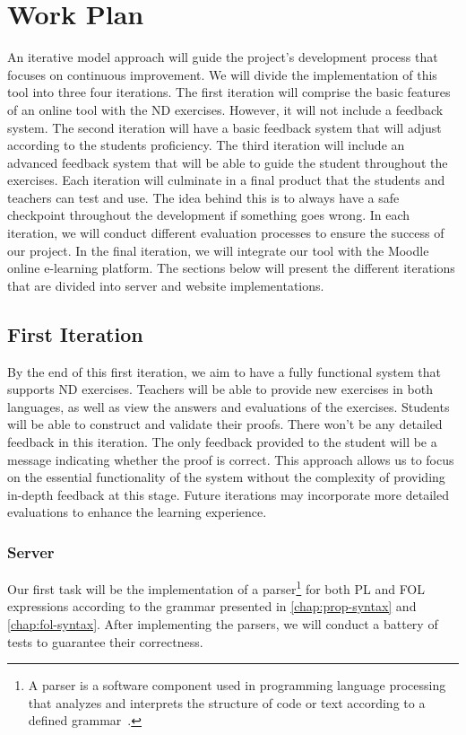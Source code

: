 \section{Work Plan}
An iterative model approach will guide the project's development process that focuses on continuous improvement. We will divide the implementation of this tool into three four iterations. The first iteration will comprise the basic features of an online tool with the \gls{ND} exercises. However, it will not include a feedback system. The second iteration will have a basic feedback system that will adjust according to the students proficiency. The third iteration will include an advanced feedback system that will be able to guide the student throughout the exercises. Each iteration will culminate in a final product that the students and teachers can test and use. The idea behind this is to always have a safe checkpoint throughout the development if something goes wrong. In each iteration, we will conduct different evaluation processes to ensure the success of our project. In the final iteration, we will integrate our tool with the Moodle online e-learning platform. The sections below will present the different iterations that are divided into server and website implementations.

\subsection{First Iteration}
By the end of this first iteration, we aim to have a fully functional system that supports \gls{ND} exercises. Teachers will be able to provide new exercises in both languages, as well as view the answers and evaluations of the exercises. Students will be able to construct and validate their proofs. There won't be any detailed feedback in this iteration. The only feedback provided to the student will be a message indicating whether the proof is correct. This approach allows us to focus on the essential functionality of the system without the complexity of providing in-depth feedback at this stage. Future iterations may incorporate more detailed evaluations to enhance the learning experience.

\subsubsection{Server}
Our first task will be the implementation of a parser\footnote{A parser is a software component used in programming language processing that analyzes and interprets the structure of code or text according to a defined grammar~\cite{afroozeh_2015_one}.} for both \gls{PL} and \gls{FOL} expressions according to the grammar presented in \ref{chap:prop-syntax} and \ref{chap:fol-syntax}. After implementing the parsers, we will conduct a battery of tests to guarantee their correctness. 

